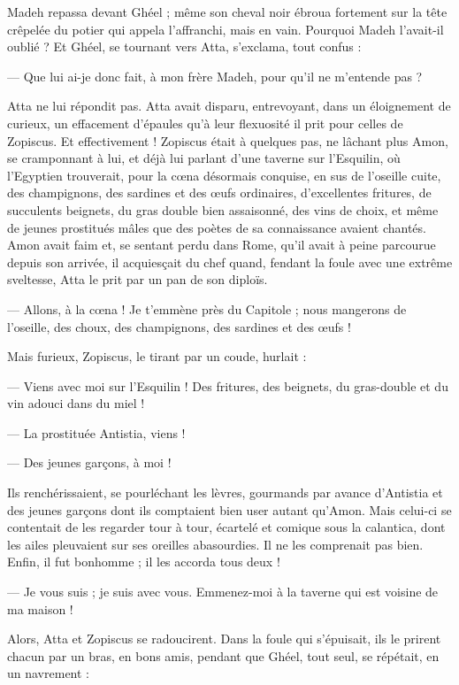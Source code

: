 \documentclass[a4paper, 11pt, oneside, polutonikogreek, french]{article}
\begin{document}
Madeh repassa devant Ghéel ; même son cheval noir ébroua fortement sur la tête crêpelée du potier qui appela l'affranchi, mais en vain. Pourquoi Madeh l'avait-il oublié ? Et Ghéel, se tournant vers Atta, s'exclama, tout confus :

--- Que lui ai-je donc fait, à mon frère Madeh, pour qu'il ne m'entende pas ?

Atta ne lui répondit pas. Atta avait disparu, entrevoyant, dans un éloignement de curieux, un effacement d'épaules qu'à leur flexuosité il prit pour celles de Zopiscus. Et effectivement ! Zopiscus était à quelques pas, ne lâchant plus Amon, se cramponnant à lui, et déjà lui parlant d'une taverne sur l'Esquilin, où l'Egyptien trouverait, pour la cœna désormais conquise, en sus de l'oseille cuite, des champignons, des sardines et des œufs ordinaires, d'excellentes fritures, de succulents beignets, du gras double bien assaisonné, des vins de choix, et même de jeunes prostitués mâles que des poètes de sa connaissance avaient chantés. Amon avait faim et, se sentant perdu dans Rome, qu'il avait à peine parcourue depuis son arrivée, il acquiesçait du chef quand, fendant la foule avec une extrême sveltesse, Atta le prit par un pan de son diploïs.

--- Allons, à la cœna ! Je t'emmène près du Capitole ; nous mangerons de l'oseille, des choux, des champignons, des sardines et des œufs !

Mais furieux, Zopiscus, le tirant par un coude, hurlait :

--- Viens avec moi sur l'Esquilin ! Des fritures, des beignets, du gras-double et du vin adouci dans du miel !

--- La prostituée Antistia, viens !

--- Des jeunes garçons, à moi !

Ils renchérissaient, se pourléchant les lèvres, gourmands par avance d’Antistia et des jeunes garçons dont ils comptaient bien user autant qu'Amon. Mais celui-ci se contentait de les regarder tour à tour, écartelé et comique sous la calantica, dont les ailes pleuvaient sur ses oreilles abasourdies. Il ne les comprenait pas bien. Enfin, il fut bonhomme ; il les accorda tous deux !

--- Je vous suis ; je suis avec vous. Emmenez-moi à la taverne qui est voisine de ma maison !

Alors, Atta et Zopiscus se radoucirent. Dans la foule qui s'épuisait, ils le prirent chacun par un bras, en bons amis, pendant que Ghéel, tout seul, se répétait, en un navrement :
\end{document}
